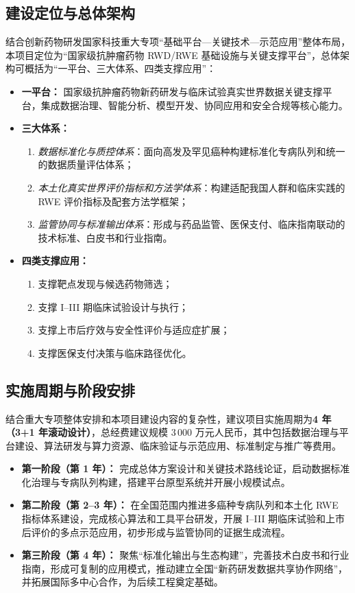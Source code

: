 \documentclass[12pt, a4paper, fontset=mac]{ctexart} %
\begin{document}
\subsection{建设定位与总体架构}

结合创新药物研发国家科技重大专项“基础平台—关键技术—示范应用”整体布局，本项目定位为“国家级抗肿瘤药物 RWD/RWE 基础设施与关键支撑平台”，总体架构可概括为“一平台、三大体系、四类支撑应用”：

\begin{itemize}
  \item \textbf{一平台：} 国家级抗肿瘤药物新药研发与临床试验真实世界数据关键支撑平台，集成数据治理、智能分析、模型开发、协同应用和安全合规等核心能力。
  \item \textbf{三大体系：}
    \begin{enumerate}[label=(\arabic*)]
      \item \emph{数据标准化与质控体系}：面向高发及罕见癌种构建标准化专病队列和统一的数据质量评估体系；
      \item \emph{本土化真实世界评价指标和方法学体系}：构建适配我国人群和临床实践的 RWE 评价指标及配套方法学框架；
      \item \emph{监管协同与标准输出体系}：形成与药品监管、医保支付、临床指南联动的技术标准、白皮书和行业指南。
    \end{enumerate}
  \item \textbf{四类支撑应用：}
    \begin{enumerate}[label=(\arabic*)]
      \item 支撑靶点发现与候选药物筛选；
      \item 支撑 I--III 期临床试验设计与执行；
      \item 支撑上市后疗效与安全性评价与适应症扩展；
      \item 支撑医保支付决策与临床路径优化。
    \end{enumerate}
\end{itemize}

\subsection{实施周期与阶段安排}

结合重大专项整体安排和本项目建设内容的复杂性，建议项目实施周期为\textbf{4 年（3+1 年滚动设计）}，总经费建议规模 3\,000 万元人民币，其中包括数据治理与平台建设、算法研发与算力资源、临床验证与示范应用、标准制定与推广等费用。

\begin{itemize}
  \item \textbf{第一阶段（第 1 年）：} 完成总体方案设计和关键技术路线论证，启动数据标准化治理与专病队列构建，搭建平台原型系统并开展小规模试点。
  \item \textbf{第二阶段（第 2--3 年）：} 在全国范围内推进多癌种专病队列和本土化 RWE 指标体系建设，完成核心算法和工具平台研发，开展 I--III 期临床试验和上市后评价的多点示范应用，初步形成与监管协同的证据生成流程。
  \item \textbf{第三阶段（第 4 年）：} 聚焦“标准化输出与生态构建”，完善技术白皮书和行业指南，形成可复制的应用模式，推动建立全国“新药研发数据共享协作网络”，并拓展国际多中心合作，为后续工程奠定基础。
\end{itemize}
\end{document}

